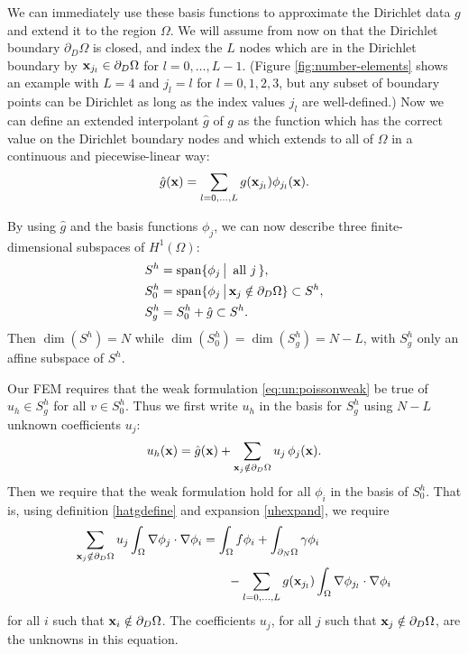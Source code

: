 We can immediately use these basis functions to approximate the Dirichlet data $g$ and extend it to the region $\Omega$.  We will assume from now on that the Dirichlet boundary $\partial_D\Omega$ is closed, and index the $L$ nodes which are in the Dirichlet boundary by $\mathbf{x}_{j_l} \in \partial_D\Omega$ for $l=0,\dots,L-1$.  (Figure \ref{fig:number-elements} shows an example with $L=4$ and $j_l=l$ for $l=0,1,2,3$, but any subset of boundary points can be Dirichlet as long as the index values $j_l$ are well-defined.)  Now we can define an extended interpolant $\hat g$ of $g$ as the function which has the correct value on the Dirichlet boundary nodes and which extends to all of $\Omega$ in a continuous and piecewise-linear way:
\begin{equation}
\hat g(\mathbf{x}) = \sum_{l=0,\dots,L} g(\mathbf{x}_{j_l}) \phi_{j_l}(\mathbf{x}). \label{hatgdefine}
\end{equation}

By using $\hat g$ and the basis functions $\phi_j$, we can now describe three finite-dimensional subspaces of $H^1(\Omega)$:
\begin{align*}
S^h &= \operatorname{span}\{\phi_j \,\big|\, \text{ all } j\,\}, \\
S_0^h &= \operatorname{span}\{\phi_j \,\big|\, \mathbf{x}_j \notin \partial_D \Omega\} \subset S^h, \\
S_g^h &= S_0^h + \hat g \subset S^h.
\end{align*}
Then $\dim(S^h)=N$ while $\dim(S_0^h)=\dim(S_g^h)=N-L$, with $S_g^h$ only an affine subspace of $S^h$.

Our FEM requires that the weak formulation  \eqref{eq:un:poissonweak} be true of $u_h\in S_g^h$ for all $v\in S_0^h$.  Thus we first write $u_h$ in the basis for $S_g^h$ using $N-L$ unknown coefficients $u_j$:
\begin{equation}
u_h(\mathbf{x}) = \hat g(\mathbf{x}) + \sum_{\mathbf{x}_j \notin \partial_D \Omega} u_j\, \phi_j(\mathbf{x}). \label{uhexpand}
\end{equation}
Then we require that the weak formulation hold for all $\phi_i$ in the basis of $S_0^h$.  That is, using definition \eqref{hatgdefine} and expansion \eqref{uhexpand}, we require
\begin{align}
\sum_{\mathbf{x}_j \notin \partial_D \Omega} u_j \int_\Omega \nabla \phi_j \cdot \nabla \phi_i &= \int_\Omega f \phi_i + \int_{\partial_N\Omega} \gamma \phi_i \label{poissonfem} \\
&\qquad - \sum_{l=0,\dots,L} g(\mathbf{x}_{j_l})  \int_\Omega \nabla \phi_{j_l} \cdot \nabla \phi_i \notag
\end{align}
for all $i$ such that $\mathbf{x}_i \notin \partial_D \Omega$.  The coefficients $u_j$, for all $j$ such that $\mathbf{x}_j \notin \partial_D \Omega$, are the unknowns in this equation.

